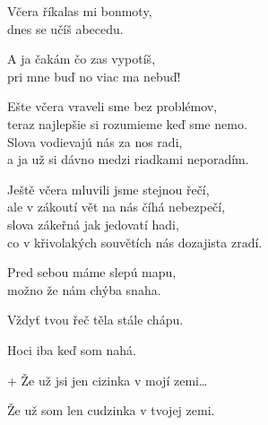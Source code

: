\ve{}
Včera říkalas mi bonmoty, \\
dnes se učíš abecedu. 

A ja čakám čo zas vypotíš, \\
pri mne buď no viac ma nebuď! 

\cho{}

\ve{}
Ešte včera vraveli sme bez problémov, \\
teraz najlepšie si rozumieme keď sme nemo. \\
Slova vodievajú nás za nos radi, \\
a ja už si dávno medzi riadkami neporadím. 

\ve{}
Ještě včera mluvili jsme stejnou řečí, \\
ale v zákoutí vět na nás číhá nebezpečí, \\
slova zákeřná jak jedovatí hadi, \\
co v křivolakých souvětích nás dozajista zradí. 

\ve{}
Pred sebou máme slepú mapu, \\
možno že nám chýba snaha. 

Vždyť tvou řeč těla stále chápu. 

Hoci iba keď som nahá. 

\cho{}
+ Že už jsi jen cizinka v mojí zemi\ldots

Že už som len cudzinka v tvojej zemi. 

\esong{}